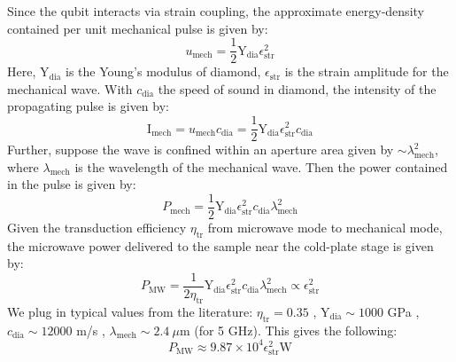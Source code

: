 Since the qubit interacts via strain coupling, the approximate energy-density contained per unit mechanical pulse is given by:
\begin{equation}
    u_{\text{mech}}  = \frac{1}{2}\mathrm{Y}_{\text{dia}}\epsilon_{\text{str}}^{2}
\end{equation}
Here, $\mathrm{Y}_{\text{dia}}$ is the Young's modulus of diamond, $\epsilon
_{\text{str}}$ is the strain amplitude for the mechanical wave. With $c_{\text{dia}}$ the speed of sound in diamond, the intensity of the propagating pulse is given by:
\begin{equation}
    \text{I}_{\text{mech}} =  u_{\text{mech}} c_{\text{dia}}  = \frac{1}{2}\mathrm{Y}_{\text{dia}}\epsilon_{\text{str}}^{2}c_{\text{dia}}
\end{equation}
Further, suppose the wave is confined within an aperture area given by $\sim\lambda_{\text{mech}}^{2}$, where $\lambda_{\text{mech}}$ is the wavelength of the mechanical wave. Then the power contained in the pulse is given by:
\begin{equation}
    P_{\text{mech}} = \frac{1}{2}\mathrm{Y}_{\text{dia}}\epsilon_{\text{str}}^{2}c_{\text{dia}}\lambda_{\text{mech}}^{2}
\end{equation}
Given the transduction efficiency $\eta_{\text{tr}}$ from microwave mode to mechanical mode, the microwave power delivered to the sample near the cold-plate stage is given by:
\begin{equation}
    P_{\text{MW}} = \frac{1}{2\eta_{\text{tr}}}\mathrm{Y}_{\text{dia}}\epsilon_{\text{str}}^{2}c_{\text{dia}}\lambda_{\text{mech}}^{2} \propto \epsilon_{\text{str}}^{2}
\end{equation}
We plug in typical values from the literature: $\eta_{\text{tr}}=0.35$ \cite{mirhosseini2020superconducting}, $\mathrm{Y}_{\text{dia}}\sim1000$ GPa \cite{brisDiamondProperties}, $c_{\text{dia}}\sim 12000$ m/s \cite{brisDiamondProperties}, $\lambda_{\text{mech}}\sim 2.4~\mu$m (for 5 GHz). This gives the following:
\begin{equation}
    P_{\text{MW}} \approx 9.87\times10^{4}\epsilon_{\text{str}}^{2} \text{W}
\end{equation}

